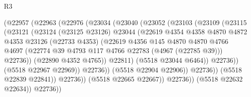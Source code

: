 \begin{lexlean}{R3}
\begin{coremodule}
                          (@22957
                            (@22963
                              (@22976
                                (@23034
                                  (@23040
                                    (@23052
                                      (@23103
                                        (@23109
                                          (@23115
                                            (@23121
                                              (@23124
                                                (@23125 @23126)
                                                @23044
                                                (@22619
                                                  @4354
                                                  @4358
                                                  @4870
                                                  @4872
                                                  @4353
                                                  @23126
                                                  (@22733 @4353)
                                                  (@22619
                                                    @4356
                                                    @145
                                                    @4870
                                                    @4870
                                                    @4766
                                                    @4697
                                                    (@22774
                                                      @39
                                                      @4793
                                                      @117
                                                      @4766
                                                      @22783
                                                      (@4967 (@22785 @39)))
                                                    @22736))
                                                (@22890 @4352 @4765))
                                              @22811)
                                            (@5518 @23044 @6464))
                                          @22736))
                                      (@5518 @22967 @22969))
                                    @22736))
                                (@5518 @22904 @22906))
                              @22736))
                          (@5518 @22839 @22841))
                        @22736))
                    (@5518 @22665 @22667))
                  @22736))
              (@5518 @22632 @22634))
            @22736))

\end{coremodule}
\end{lexlean}
